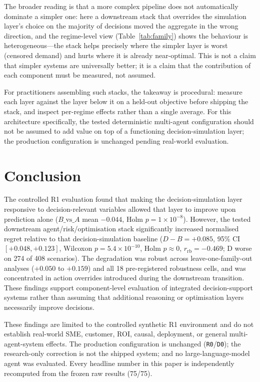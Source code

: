 \documentclass[conference]{IEEEtran}
\newcommand{\code}[1]{\texttt{#1}}
\newcommand{\dvb}{\ensuremath{D\!-\!B}}
\newcommand{\rb}{\ensuremath{r_{\mathrm{rb}}}}
\begin{document}
The broader reading is that a more complex pipeline does not automatically
dominate a simpler one: here a downstream stack that overrides the
simulation layer's choice on the majority of decisions moved the aggregate in
the wrong direction, and the regime-level view (Table~\ref{tab:family}) shows the
behaviour is heterogeneous---the stack helps precisely where the simpler layer
is worst (censored demand) and hurts where it is already near-optimal. This is
not a claim that simpler systems are universally better; it is a claim that the
contribution of each component must be measured, not assumed.

For practitioners assembling such stacks, the takeaway is procedural: measure
each layer against the layer below it on a held-out objective before shipping
the stack, and inspect per-regime effects rather than a single average. For this
architecture specifically, the tested deterministic multi-agent configuration
should not be assumed to add value on top of a functioning decision-simulation
layer; the production configuration is unchanged pending real-world evaluation.

\section{Conclusion}\label{sec:conc}
The controlled R1 evaluation found that making the decision-simulation layer
responsive to decision-relevant variables allowed that layer to improve upon
prediction alone ($B\text{\_vs\_}A$ mean $-0.044$, Holm $p=1\times10^{-8}$).
However, the tested downstream agent/risk/optimisation stack significantly
increased normalised regret relative to that decision-simulation baseline
($\dvb = +0.085$, 95\% CI $[+0.048,+0.123]$, Wilcoxon $p=5.4\times10^{-10}$,
Holm $p\approx0$, \rb${}=-0.469$; D worse on 274 of 408 scenarios). The
degradation was robust across leave-one-family-out analyses ($+0.050$ to
$+0.159$) and all 18 pre-registered robustness cells, and was concentrated in
action overrides introduced during the downstream transition. These findings
support component-level evaluation of integrated decision-support systems rather
than assuming that additional reasoning or optimisation layers necessarily
improve decisions.

These findings are limited to the controlled synthetic R1 environment and do not
establish real-world SME, customer, ROI, causal, deployment, or general
multi-agent-system effects. The production configuration is unchanged
(\code{R0}/\code{D0}); the research-only correction is not the shipped system;
and no large-language-model agent was evaluated. Every headline number in this
paper is independently recomputed from the frozen raw results (75/75).
\end{document}
